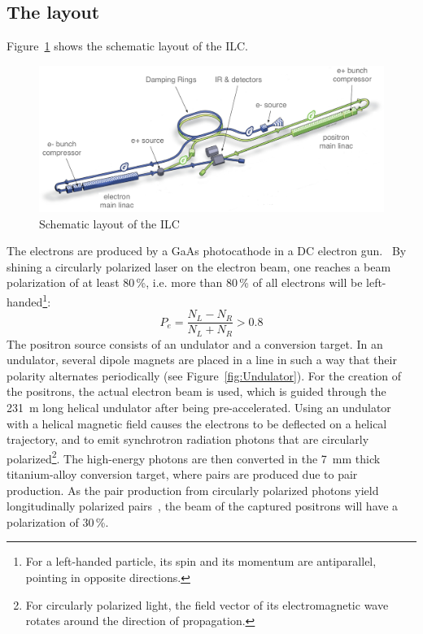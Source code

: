 \subsection{The layout}
Figure~\ref{fig:ILC_Layout} shows the schematic layout of the ILC.
\begin{figure}
\centering
\includegraphics[width=\textwidth]{Figures/ILC_layout_edited.png}
\caption[Schematic layout of the ILC]{Schematic layout of the ILC~\cite[based on p. 9]{TDR1}}
\label{fig:ILC_Layout}
\end{figure}
The electrons are produced by a GaAs photocathode in a DC electron gun.~\cite[p. 13]{TDR32}
By shining a circularly polarized laser on the electron beam, one reaches a beam polarization of at least 80\,\%, i.e. more than 80\,\% of all electrons will be left-handed\footnote{For a left-handed particle, its spin and its momentum are antiparallel, pointing in opposite directions.}:
\begin{equation}
 P_e = \frac{N_L-N_R}{N_L+N_R} > 0.8
\end{equation}
The positron source consists of an undulator and a conversion target.
In an undulator, several dipole magnets are placed in a line in such a way that their polarity alternates periodically (see Figure~\ref{fig:Undulator}).
For the creation of the positrons, the actual electron beam is used, which is guided through the  \SI{231}{\meter} long helical undulator after being pre-accelerated.
Using an undulator with a helical magnetic field causes the electrons to be deflected on a helical trajectory, and to emit synchrotron radiation photons that are circularly polarized\footnote{For circularly polarized light, the field vector of its electromagnetic wave rotates around the direction of propagation.}.
The high-energy photons are then converted in the \SI{7}{\milli\meter} thick titanium-alloy conversion target, where \positron \electron pairs are produced due to pair production.
As the pair production from circularly polarized photons yield longitudinally polarized \positron \electron pairs~\cite{Polarization}, the beam of the captured positrons will have a polarization of 30\,\%.~\cite[p. 14]{TDR32}
